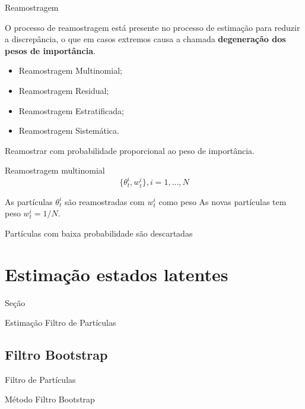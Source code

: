 \documentclass{beamer}
\begin{document}
\begin{frame}{Reamostragem}

O processo de reamostragem está presente no processo de estimação para reduzir a discrepância, o que em casos extremos causa a chamada \textbf{degeneração dos pesos de importância}. 

\pause

\begin{itemize}
\item Reamostragem Multinomial;
\item Reamostragem Residual;
\item Reamostragem Estratificada;
\item Reamostragem Sistemática.
\end{itemize}

\pause

Reamostrar com probabilidade proporcional ao peso de importância.

\end{frame}


\begin{frame}{Reamostragem multinomial}
$$
\{\theta_t^i,w_t^i\},  i=1,...,N
$$

\pause
\vspace{0.5cm} 
As partículas $\theta^i_t$ são reamostradas com $w^i_t$ como peso
\pause
\vspace{0.5cm} 
As novas partículas tem peso $w^i_t = 1/N$. 
\vspace{0.5cm} 

\pause
Partículas com baixa probabilidade são descartadas

\end{frame}




\section{Estimação estados latentes}
\begin{frame}{Seção}
    \begin{block}{Estimação}
      \Huge  Filtro de Partículas
    \end{block}
\end{frame}

\subsection{Filtro Bootstrap}
\begin{frame}{Filtro de Partículas}
    \begin{block}{Método}
      \Huge  Filtro Bootstrap
    \end{block}
\end{frame}
\end{document}
